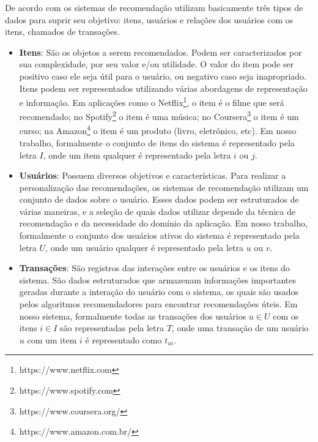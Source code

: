 De acordo com  os sistemas de recomendação utilizam basicamente três tipos de dados para suprir seu objetivo: itens, usuários e relações dos usuários com os itens, chamados de transações.

\begin{itemize}
	\item{\textbf{Itens}: São os objetos a serem recomendados. Podem ser caracterizados por sua complexidade, por seu valor e/ou utilidade. O valor do item pode ser positivo caso ele seja útil para o usuário, ou negativo caso seja inapropriado. Itens podem ser representados utilizando várias abordagens de representação e informação. Em aplicações como o Netflix\footnote{https://www.netflix.com}, o item é o filme que será recomendado; no Spotify\footnote{https://www.spotify.com} o item é uma música; no Coursera\footnote{https://www.coursera.org/} o item é um curso; na Amazon\footnote{https://www.amazon.com.br/} o item é um produto (livro, eletrônico, etc). Em nosso trabalho, formalmente o conjunto de itens do sistema é representado pela letra $I$, onde um item qualquer é representado pela letra $i$ ou $j$.}

	\item{\textbf{Usuários}: Possuem diversos objetivos e características. Para realizar a personalização das recomendações, os sistemas de recomendação utilizam um conjunto de dados sobre o usuário. Esses dados podem ser estruturados de várias maneiras, e a seleção de quais dados utilizar depende da técnica de recomendação e da necessidade do domínio da aplicação. Em nosso trabalho, formalmente o conjunto dos usuários ativos do sistema é representado pela letra $U$, onde um usuário qualquer é representado pela letra $u$ ou $v$.}

	\item{\textbf{Transações}: São registros das interações entre os usuários e os itens do sistema. São dados estruturados que armazenam informações importantes geradas durante a interação do usuário com o sistema, os quais são usados pelos algoritmos recomendadores para encontrar recomendações úteis. Em nosso sistema, formalmente todas as transações dos usuários $u \in U$ com os itens $i \in I$ são representadas pela letra $T$, onde uma transação de um usuário $u$ com um item $i$ é representado como $t_{ui}$.}
\end{itemize}

